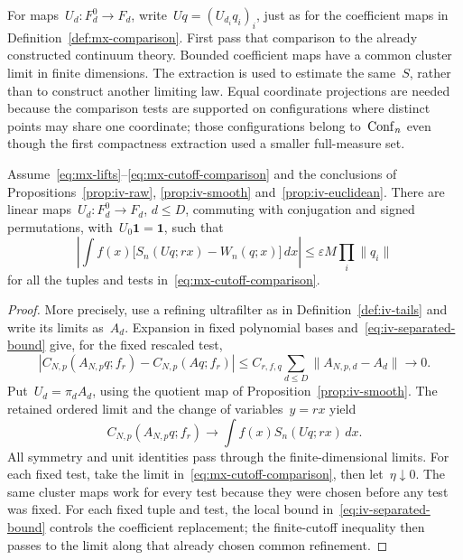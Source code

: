 For maps~$U_d:F_d^0\to F_d$, write~$Uq=(U_{d_i}q_i)_i$, just as for the coefficient maps in Definition~\ref{def:mx-comparison}.
First pass that comparison to the already constructed continuum theory.
Bounded coefficient maps have a common cluster limit in finite dimensions.
The extraction is used to estimate the same~$S$, rather than to construct another limiting law. Equal coordinate projections are needed because the comparison tests are supported on configurations where distinct points may share one coordinate; those configurations belong to~$\operatorname{Conf}_{n}$ even though the first compactness extraction used a smaller full-measure set.

\begin{lemma}\label{lem:mx-passage}
Assume~\eqref{eq:mx-lifts}--\eqref{eq:mx-cutoff-comparison} and the conclusions of Propositions~\ref{prop:iv-raw}, \ref{prop:iv-smooth} and~\ref{prop:iv-euclidean}.
There are linear maps~$U_d:F_d^0\to F_d$, $d\le D$, commuting with conjugation and signed permutations, with~$U_0\mathbf1=\mathbf1$, such that
\begin{equation}\label{eq:mx-continuum-comparison}
 \left|\int f(x)\bigl[S_n(Uq;rx)-W_n(q;x)\bigr]\,dx\right|
 \le\varepsilon M\prod_i\|q_i\|
\end{equation}
for all the tuples and tests in~\eqref{eq:mx-cutoff-comparison}.
\end{lemma}

\begin{proof}
More precisely, use a refining ultrafilter as in Definition~\ref{def:iv-tails} and write its limits as~$A_d$.
Expansion in fixed polynomial bases and~\eqref{eq:iv-separated-bound} give, for the fixed rescaled test,
\begin{equation*}
 \left|C_{N,p}(A_{N,p}q;f_r)-C_{N,p}(Aq;f_r)\right|
 \le C_{r,f,q}\sum_{d\le D}\|A_{N,p,d}-A_d\|\longrightarrow0.
\end{equation*}
Put~$U_d=\pi_dA_d$, using the quotient map of Proposition~\ref{prop:iv-smooth}.
The retained ordered limit and the change of variables~$y=rx$ yield
\begin{equation*}
 C_{N,p}(A_{N,p}q;f_r)\longrightarrow\int f(x)S_n(Uq;rx)\,dx.
\end{equation*}
All symmetry and unit identities pass through the finite-dimensional limits.
For each fixed test, take the limit in~\eqref{eq:mx-cutoff-comparison}, then let~$\eta\downarrow0$.
The same cluster maps work for every test because they were chosen before any test was fixed. For each fixed tuple and test, the local bound in~\eqref{eq:iv-separated-bound} controls the coefficient replacement; the finite-cutoff inequality then passes to the limit along that already chosen common refinement.
\end{proof}

